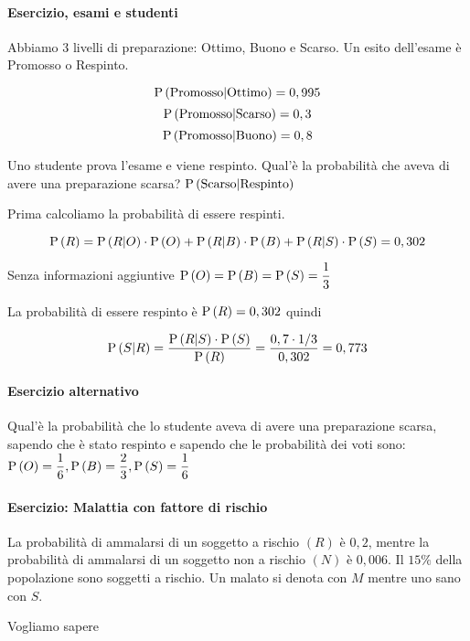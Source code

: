 \paragraph{Esercizio, esami e studenti}

Abbiamo 3 livelli di preparazione: Ottimo, Buono e Scarso.
Un esito dell'esame è Promosso o Respinto.

\[ \text{P}\left(\text{Promosso} | \text{Ottimo}\right) = 0,995\]
\[ \text{P}\left(\text{Promosso} | \text{Scarso}\right) = 0,3\]
\[ \text{P}\left(\text{Promosso} | \text{Buono}\right) = 0,8\]

Uno studente prova l'esame e viene respinto. Qual'è la probabilità che aveva di avere una preparazione scarsa? $ \text{P}\left(\text{Scarso}|\text{Respinto}\right) $

Prima calcoliamo la probabilità di essere respinti.

\[ \text{P}\left(R\right) = \text{P}\left(R|O\right) \cdot \text{P}\left(O\right) + \text{P}\left(R | B\right) \cdot \text{P}\left(B\right) + \text{P}\left(R|S\right) \cdot \text{P}\left(S\right) = 0,302 \]

Senza informazioni aggiuntive $ \text{P}\left(O\right) = \text{P}\left(B\right) = \text{P}\left(S\right) = \dfrac{1}{3} $

La probabilità di essere respinto è $ \text{P}\left(R\right) = 0,302 $ quindi 

\[ \text{P}\left(S | R\right) = \dfrac{\text{P}\left(R|S\right)\cdot \text{P}\left(S\right)}{\text{P}\left(R\right)} = \dfrac{0,7 \cdot 1/3}{0,302} = 0,773 \]

\paragraph{Esercizio alternativo}


Qual'è la probabilità che lo studente aveva di avere una preparazione scarsa, sapendo che è stato respinto e sapendo che le probabilità dei voti sono: $ \text{P}\left(O\right) = \dfrac{1}{6}, \text{P}\left(B\right) = \dfrac{2}{3}, \text{P}\left(S\right) = \dfrac{1}{6} $

\paragraph{Esercizio: Malattia con fattore di rischio}
La probabilità di ammalarsi di un soggetto a rischio $ (R) $ è $ 0,2 $, mentre la probabilità di ammalarsi di un soggetto non a rischio $ (N) $ è $ 0,006 $. Il $ 15\% $ della popolazione sono soggetti a rischio. Un malato si denota con $ M $ mentre uno sano con $ S $.

Vogliamo sapere 

